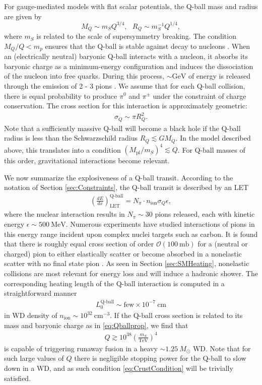 \documentclass[twocolumn,showpacs,preprintnumbers,amsmath,amssymb,prd]{revtex4}
\newcommand{\OO}{\mathcal{O}}
\def\r{\right)}
\def\l{\left(}
\begin{document}
For gauge-mediated models with flat scalar potentials, the Q-ball mass and radius are given by
\begin{equation}
\label{eq:Qballprop}
M_Q \sim m_S Q^{3/4}, ~~~ R_Q \sim m_S^{-1} Q^{1/4},
\end{equation}
where $m_S$ is related to the scale of supersymmetry breaking.
The condition $M_Q/Q < m_p$ ensures that the Q-ball is stable against decay to nucleons \cite{Dine:2003ax}.
When an (electrically neutral) baryonic Q-ball interacts with a nucleon, it absorbs its baryonic charge as a minimum-energy configuration and induces the dissociation of the nucleon into free quarks.
During this process, $\sim \text{GeV}$ of energy is released through the emission of 2 - 3 pions \cite{Dine:2003ax}.
We assume that for each Q-ball collision, there is equal probability to produce $\pi^0$ and $\pi^\pm$ under the constraint of charge conservation.
The cross section for this interaction is approximately geometric:
\begin{align}
\sigma_Q \sim \pi R_Q^2.
\end{align}
Note that a sufficiently massive Q-ball will become a black hole if the Q-ball radius is less than the Schwarzschild radius $R_Q \lesssim G M_Q$.
In the model described above, this translates into a condition $(M_\text{pl}/m_S)^4 \lesssim Q$.
For Q-ball masses of this order, gravitational interactions become relevant.

We now summarize the explosiveness of a Q-ball transit.
According to the notation of Section \ref{sec:Constraints}, the Q-ball transit is described by an LET
\begin{align}
\left( \frac{d E}{d x} \right)^\text{Q-ball}_\text{LET} = N_\pi \cdot n_\text{ion} \sigma_Q \epsilon,
\end{align}
where the nuclear interaction results in $N_\pi \sim 30$ pions released, each with kinetic energy $\epsilon \sim 500 ~\text{MeV}$.
Numerous experiments have studied interactions of pions in this energy range incident upon complex nuclei targets such as carbon.
It is found that there is roughly equal cross section of order $\OO (100 ~\text{mb})$ for a (neutral or charged) pion to either elastically scatter or become absorbed in a nonelastic scatter with no final state pion \cite{Pionnuclear}.
As seen in Section \ref{sec:SMHeating}, nonelastic collisions are most relevant for energy loss and will induce a hadronic shower.
The corresponding heating length of the Q-ball interaction is computed in a straightforward manner
\begin{align}
L_0^\text{Q-ball} \sim \text{few} \times 10^{-7} ~\text{cm}
\end{align}
in WD density of $n_\text{ion} \sim 10^{32} ~\text{cm}^{-3}$.
If the Q-ball cross section is related to its mass and baryonic charge as in \eqref{eq:Qballprop}, we find that 
\begin{align}
Q \gtrsim 10^{38} \l\frac{m_S}{\text{TeV}}\r^4
\end{align}
is capable of triggering runaway fusion in a heavy $\sim 1.25 ~M_{\odot}$ WD.
Note that for such large values of $Q$ there is negligible stopping power for the Q-ball to slow down in a WD, and as such condition \eqref{eq:CrustCondition} will be trivially satisfied.
\end{document}
